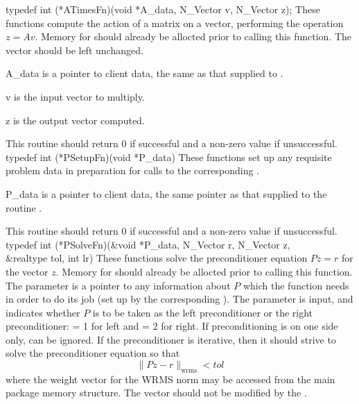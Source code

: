{
  typedef int (*ATimesFn)(void *A\_data, N\_Vector v, N\_Vector z);
}
{
  These functions compute the action of a matrix on a vector,
  performing the operation $z = Av$.  Memory for  should already be
  allocted prior to calling this function.  The vector  should
  be left unchanged.
}
{
  \begin{args}[A\_data]
  \item[A\_data]
    is a pointer to client data, the same as that supplied to .
  \item[v]
    is the input vector to multiply.
  \item[z]
    is the output vector computed.
  \end{args}
}
{
  This routine should return 0 if successful and a
  non-zero value if unsuccessful.
}
{}
{
  typedef int (*PSetupFn)(void *P\_data)
}
{
  These functions set up any requisite problem data in preparation
  for calls to the corresponding .
}
{
  \begin{args}[P\_data]
  \item[P\_data]
    is a pointer to client data, the same pointer as that supplied to the routine
    .
  \end{args}
}
{
  This routine should return 0 if successful and a non-zero value if unsuccessful.
}
{}
{
  typedef int (*PSolveFn)(&void *P\_data, N\_Vector r, N\_Vector z, \\
                          &realtype tol, int lr)
}
{
  These functions solve the preconditioner equation $Pz = r$
  for the vector $z$.  Memory for  should already be
  allocted prior to calling this function.  The
  parameter  is a pointer to any information about $P$
  which the function needs in order to do its job (set up by the
  corresponding ). The parameter  is input, and
  indicates whether $P$ is to be taken as the left preconditioner or
  the right preconditioner:  = 1 for left and  = 2 for
  right.  If preconditioning is on one side only,  can be
  ignored.  If the preconditioner is iterative, then it should strive
  to solve the preconditioner equation so that
  \[
      \| Pz - r \|_{\text{wrms}} < tol
  \]
  where the weight vector for the WRMS norm may be accessed from the
  main package memory structure.  The vector  should not be
  modified by the .
}
